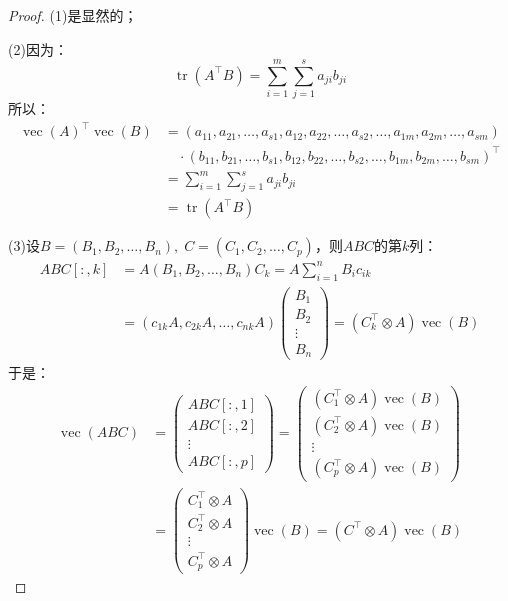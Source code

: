 \begin{proof}
	(1)是显然的；\par
	(2)因为：
	\begin{equation*}
		\operatorname{tr}(A^{\top}B)=\sum_{i=1}^{m}\sum_{j=1}^{s}a_{ji}b_{ji}
	\end{equation*}
	所以：
	\begin{align*}
		\operatorname{vec}(A)^{\top}\operatorname{vec}(B)
		&=(a_{11},a_{21},\dots,a_{s1},a_{12},a_{22},\dots,a_{s2},\dots,a_{1m},a_{2m},\dots,a_{sm}) \\
		&\quad\cdot(b_{11},b_{21},\dots,b_{s1},b_{12},b_{22},\dots,b_{s2},\dots,b_{1m},b_{2m},\dots,b_{sm})^{\top} \\
		&=\sum_{i=1}^{m}\sum_{j=1}^{s}a_{ji}b_{ji} \\
		&=\operatorname{tr}(A^{\top}B)
	\end{align*}\par
	(3)设$B=(B_1,B_2,\dots,B_n),\;C=(C_1,C_2,\dots,C_p)$，则$ABC$的第$k$列：
	\begin{align*}
		ABC[:,k]
		&=A(B_1,B_2,\dots,B_n)C_k
		=A\sum_{i=1}^{n}B_ic_{ik} \\
		&=(c_{1k}A,c_{2k}A,\dots,c_{nk}A)
		\begin{pmatrix}
			B_1 \\
			B_2 \\
			\vdots \\
			B_n
		\end{pmatrix}
		=(C_k^{\top}\otimes A)\operatorname{vec}(B)
	\end{align*}
	于是：
	\begin{align*}
		\operatorname{vec}(ABC)
		&=
		\begin{pmatrix}
			ABC[:,1] \\
			ABC[:,2] \\
			\vdots \\
			ABC[:,p]
		\end{pmatrix}
		=
		\begin{pmatrix}
			(C_1^{\top}\otimes A)\operatorname{vec}(B) \\
			(C_2^{\top}\otimes A)\operatorname{vec}(B) \\
			\vdots \\
			(C_p^{\top}\otimes A)\operatorname{vec}(B)
		\end{pmatrix} \\
		&=
		\begin{pmatrix}
			C_1^{\top}\otimes A \\
			C_2^{\top}\otimes A \\
			\vdots \\
			C_p^{\top}\otimes A
		\end{pmatrix}
		\operatorname{vec}(B)
		=(C^{\top}\otimes A)\operatorname{vec}(B)
	\end{align*}
\end{proof}

